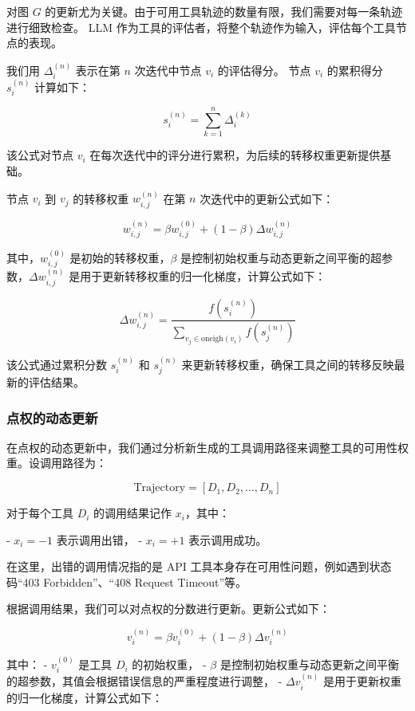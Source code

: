 对图 \( G \) 的更新尤为关键。由于可用工具轨迹的数量有限，我们需要对每一条轨迹进行细致检查。
LLM 作为工具的评估者，将整个轨迹作为输入，评估每个工具节点的表现。

我们用 \( \Delta_i^{(n)} \) 表示在第 \( n \) 次迭代中节点 \( v_i \) 的评估得分。
节点 \( v_i \) 的累积得分 \( s_i^{(n)} \) 计算如下：

\[
s_i^{(n)} = \sum_{k=1}^{n} \Delta_i^{(k)}
\]

该公式对节点 \( v_i \) 在每次迭代中的评分进行累积，为后续的转移权重更新提供基础。

节点 \( v_i \) 到 \( v_j \) 的转移权重 \( w_{i,j}^{(n)} \) 在第 \( n \) 次迭代中的更新公式如下：

\[
w_{i,j}^{(n)} = \beta w_{i,j}^{(0)} + (1 - \beta) \Delta w_{i,j}^{(n)}
\]

其中，\( w_{i,j}^{(0)} \) 是初始的转移权重，\( \beta \) 是控制初始权重与动态更新之间平衡的超参数，\( \Delta w_{i,j}^{(n)} \) 是用于更新转移权重的归一化梯度，计算公式如下：

\[
\Delta w_{i,j}^{(n)} = \frac{f(s_i^{(n)})}{\sum_{v_j \in \text{oneigh}(v_i)} f(s_j^{(n)})}
\]

该公式通过累积分数 \( s_i^{(n)} \) 和 \( s_j^{(n)} \) 来更新转移权重，确保工具之间的转移反映最新的评估结果。

\subsubsection{点权的动态更新}

在点权的动态更新中，我们通过分析新生成的工具调用路径来调整工具的可用性权重。设调用路径为：

\[
\text{Trajectory} = [D_1, D_2, \ldots, D_n]
\]

对于每个工具 \( D_i \) 的调用结果记作 \( x_i \)，其中：

- \( x_i = -1 \) 表示调用出错，
- \( x_i = +1 \) 表示调用成功。

在这里，出错的调用情况指的是 API 工具本身存在可用性问题，例如遇到状态码“403 Forbidden”、“408 Request Timeout”等。

根据调用结果，我们可以对点权的分数进行更新。更新公式如下：

\[
v_i^{(n)} = \beta v_i^{(0)} + (1 - \beta) \Delta v_i^{(n)}
\]

其中：
- \( v_i^{(0)} \) 是工具 \( D_i \) 的初始权重，
- \( \beta \) 是控制初始权重与动态更新之间平衡的超参数，其值会根据错误信息的严重程度进行调整，
- \( \Delta v_i^{(n)} \) 是用于更新权重的归一化梯度，计算公式如下：

